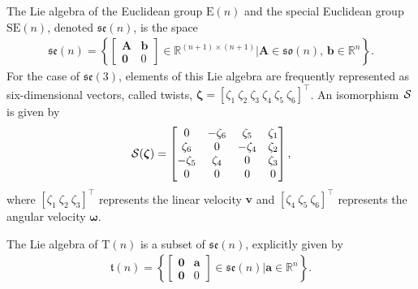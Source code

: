 \begin{example}
    The Lie algebra of the Euclidean group $\text{E}(n)$ and the special Euclidean group $\text{SE}(n)$, denoted $\mathfrak{se}(n)$, is the space
    \begin{align*}
        \mathfrak{se}(n) = \left\{\begin{bmatrix}
            \mathbf{A} & \mathbf{b} \\ \mathbf{0} & 0
        \end{bmatrix} \in \mathbb{R}^{(n+1)\times(n+1)} | \mathbf{A}\in\mathfrak{so}(n),\, \mathbf{b}\in\mathbb{R}^n\right\}.
    \end{align*}
    For the case of $\mathfrak{se}(3)$, elements of this Lie algebra are frequently represented as six-dimensional vectors, called twists, $\boldsymbol{\zeta} = [\zeta_1\ \zeta_2\ \zeta_3\ \zeta_4\ \zeta_5\ \zeta_6]^\top$. An isomorphism $\SL$ is given by
    \begin{align*}
        \SL[\boldsymbol{\zeta}] = \begin{bmatrix}
            0 & -\zeta_6 & \zeta_5 & \zeta_1 \\
            \zeta_6 & 0 & -\zeta_4 & \zeta_2 \\
            -\zeta_5 & \zeta_4 & 0 & \zeta_3 \\
            0 & 0 & 0 & 0
        \end{bmatrix},
    \end{align*}
    where $[\zeta_1\ \zeta_2\ \zeta_3]^\top$ represents the linear velocity $\mathbf{v}$ and $[\zeta_4\ \zeta_5\ \zeta_6]^\top$ represents the angular velocity $\boldsymbol{\omega}$.
\end{example}
\begin{example}
    The Lie algebra of $\text{T}(n)$ is a subset of $\mathfrak{se}(n)$, explicitly given by
    \begin{align*}
        \mathfrak{t}(n) = \left\{\begin{bmatrix}
            \mathbf{0} & \mathbf{a} \\ \mathbf{0} & 0
        \end{bmatrix} \in \mathfrak{se}(n) | \mathbf{a}\in\mathbb{R}^n\right\}.
    \end{align*} 
\end{example}
